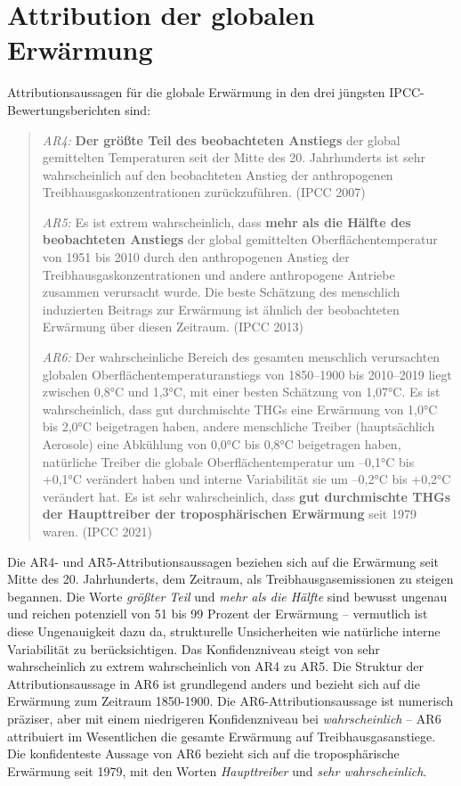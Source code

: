\documentclass[12pt,paper=a4,DIV=12,parskip=never,chapterprefix=false,headings=standardclasses]{scrreprt}
\begin{document}
\section{Attribution der globalen Erwärmung}
Attributionsaussagen für die globale Erwärmung in den drei jüngsten IPCC-Bewertungsberichten sind:

\begin{quote}
\emph{AR4:} \textbf{Der größte Teil des beobachteten Anstiegs} der global gemittelten Temperaturen seit der Mitte des 20. Jahrhunderts ist sehr wahrscheinlich auf den beobachteten Anstieg der anthropogenen Treibhausgaskonzentrationen zurückzuführen. (IPCC 2007)

\emph{AR5:} Es ist extrem wahrscheinlich, dass \textbf{mehr als die Hälfte des beobachteten Anstiegs} der global gemittelten Oberflächentemperatur von 1951 bis 2010 durch den anthropogenen Anstieg der Treibhausgaskonzentrationen und andere anthropogene Antriebe zusammen verursacht wurde. Die beste Schätzung des menschlich induzierten Beitrags zur Erwärmung ist ähnlich der beobachteten Erwärmung über diesen Zeitraum. (IPCC 2013)

\emph{AR6:} Der wahrscheinliche Bereich des gesamten menschlich verursachten globalen Oberflächentemperaturanstiegs von 1850–1900 bis 2010–2019 liegt zwischen 0,8°C und 1,3°C, mit einer besten Schätzung von 1,07°C. Es ist wahrscheinlich, dass gut durchmischte THGs eine Erwärmung von 1,0°C bis 2,0°C beigetragen haben, andere menschliche Treiber (hauptsächlich Aerosole) eine Abkühlung von 0,0°C bis 0,8°C beigetragen haben, natürliche Treiber die globale Oberflächentemperatur um –0,1°C bis +0,1°C verändert haben und interne Variabilität sie um –0,2°C bis +0,2°C verändert hat. Es ist sehr wahrscheinlich, dass \textbf{gut durchmischte THGs der Haupttreiber der troposphärischen Erwärmung} seit 1979 waren. (IPCC 2021)
\end{quote}

Die AR4- und AR5-Attributionsaussagen beziehen sich auf die Erwärmung seit Mitte des 20. Jahrhunderts, dem Zeitraum, als Treibhausgasemissionen zu steigen begannen. Die Worte \emph{größter Teil} und \emph{mehr als die Hälfte} sind bewusst ungenau und reichen potenziell von 51 bis 99 Prozent der Erwärmung – vermutlich ist diese Ungenauigkeit dazu da, strukturelle Unsicherheiten wie natürliche interne Variabilität zu berücksichtigen. Das Konfidenzniveau steigt von sehr wahrscheinlich zu extrem wahrscheinlich von AR4 zu AR5. Die Struktur der Attributionsaussage in AR6 ist grundlegend anders und bezieht sich auf die Erwärmung zum Zeitraum 1850-1900. Die AR6-Attributionsaussage ist numerisch präziser, aber mit einem niedrigeren Konfidenzniveau bei \emph{wahrscheinlich} – AR6 attribuiert im Wesentlichen die gesamte Erwärmung auf Treibhausgasanstiege. Die konfidenteste Aussage von AR6 bezieht sich auf die troposphärische Erwärmung seit 1979, mit den Worten \emph{Haupttreiber} und \emph{sehr wahrscheinlich}.
\end{document}
